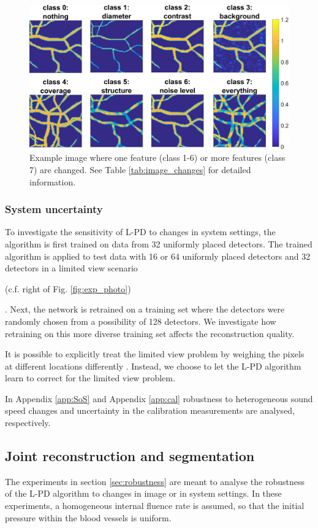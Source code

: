 \documentclass[journal]{IEEEtran}
\newcommand{\hl}[1]{\cbcolor{red}\begin{changebar}{\color{red} #1}\end{changebar}}
\begin{document}
\begin{figure}[!ht]
\centering
\includegraphics[width=\linewidth]{images/image_changes.png}
\caption{Example image where one feature (class 1-6) or more features (class 7) are changed. See Table \ref{tab:image_changes} for detailed information.}
\label{fig:image_changes}
\end{figure}

\subsubsection{System uncertainty}\label{sec:system_uncertainty}
To investigate the sensitivity of L-PD to changes in system settings, the algorithm is first trained on data from 32 uniformly placed detectors. The trained algorithm is applied to test data with 16 or 64 uniformly placed detectors and 32 detectors in a limited view scenario \hl{(c.f. right of Fig. \ref{fig:exp_photo})}. Next, the network is retrained on a training set where the detectors were randomly chosen from a possibility of 128 detectors. We investigate how retraining on this more diverse training set affects the reconstruction quality. \hl{It is possible to explicitly treat the limited view problem by weighing the pixels at different locations differently \cite{Paltauf2007,Schwab2018}. Instead, we choose to let the L-PD algorithm learn to correct for the limited view problem.

In Appendix \ref{app:SoS} and Appendix \ref{app:cal} robustness to heterogeneous sound speed changes and uncertainty in the calibration measurements are analysed, respectively.}

\subsection{Joint reconstruction and segmentation}\label{sec:segmentation}
The experiments in section \ref{sec:robustness} are meant to analyse the robustness of the L-PD algorithm to changes in image or in system settings. In these experiments, a homogeneous internal fluence rate is assumed, so that the initial pressure within the blood vessels is uniform. 
\end{document}
